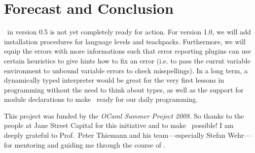 
\section{Forecast and Conclusion}

\easyocaml\ in version 0.5 is not yet completely ready for action. For version 
1.0, we will add installation procedures for language levels and 
teachpacks.
Furthermore, we will equip the errors with more informations such that error
reporting plugins can use certain heuristics to give hints how to fix an error
(i.e. to pass the currnt variable environment to unbound variable errors to
check misspellings).
In a long term, a dynamically typed interpreter would be great for the very
first lessons in programming without the need to think about types, as well as
the support for module declarations to make \easyocaml\ ready for our daily
programming.


This project was funded by the \emph{OCaml Summer Project 2008}.
So thanks to the people at Jane Street Capital for this initiative and to
make \easyocaml\ possible!
I am deeply grateful to Prof.\ Peter Thiemann and his team---especially Stefan
Wehr---for mentoring and guiding me through the course of \easyocaml.

